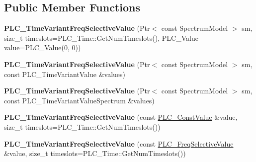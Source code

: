\subsection*{\-Public \-Member \-Functions}
\begin{DoxyCompactItemize}
\item 
\hypertarget{classns3_1_1PLC__TimeVariantFreqSelectiveValue_ae513ad6f9b4f73c838ec7fd92807067b}{{\bfseries \-P\-L\-C\-\_\-\-Time\-Variant\-Freq\-Selective\-Value} (\-Ptr$<$ const \-Spectrum\-Model $>$ sm, size\-\_\-t timeslots=\-P\-L\-C\-\_\-\-Time\-::\-Get\-Num\-Timeslots(), \-P\-L\-C\-\_\-\-Value value=\-P\-L\-C\-\_\-\-Value(0, 0))}\label{classns3_1_1PLC__TimeVariantFreqSelectiveValue_ae513ad6f9b4f73c838ec7fd92807067b}

\item 
\hypertarget{classns3_1_1PLC__TimeVariantFreqSelectiveValue_a6f5410bc5bcc702735d5d9fb571e8fd5}{{\bfseries \-P\-L\-C\-\_\-\-Time\-Variant\-Freq\-Selective\-Value} (\-Ptr$<$ const \-Spectrum\-Model $>$ sm, const \-P\-L\-C\-\_\-\-Time\-Variant\-Value \&values)}\label{classns3_1_1PLC__TimeVariantFreqSelectiveValue_a6f5410bc5bcc702735d5d9fb571e8fd5}

\item 
\hypertarget{classns3_1_1PLC__TimeVariantFreqSelectiveValue_a03b0495e0aba420d4c218d62064105d2}{{\bfseries \-P\-L\-C\-\_\-\-Time\-Variant\-Freq\-Selective\-Value} (\-Ptr$<$ const \-Spectrum\-Model $>$ sm, const \-P\-L\-C\-\_\-\-Time\-Variant\-Value\-Spectrum \&values)}\label{classns3_1_1PLC__TimeVariantFreqSelectiveValue_a03b0495e0aba420d4c218d62064105d2}

\item 
\hypertarget{classns3_1_1PLC__TimeVariantFreqSelectiveValue_a510556e902118152bcc93743e781a4bb}{{\bfseries \-P\-L\-C\-\_\-\-Time\-Variant\-Freq\-Selective\-Value} (const \hyperlink{classns3_1_1PLC__ConstValue}{\-P\-L\-C\-\_\-\-Const\-Value} \&value, size\-\_\-t timeslots=\-P\-L\-C\-\_\-\-Time\-::\-Get\-Num\-Timeslots())}\label{classns3_1_1PLC__TimeVariantFreqSelectiveValue_a510556e902118152bcc93743e781a4bb}

\item 
\hypertarget{classns3_1_1PLC__TimeVariantFreqSelectiveValue_a22998b3dd37b2f158ca0470a7c83b401}{{\bfseries \-P\-L\-C\-\_\-\-Time\-Variant\-Freq\-Selective\-Value} (const \hyperlink{classns3_1_1PLC__FreqSelectiveValue}{\-P\-L\-C\-\_\-\-Freq\-Selective\-Value} \&value, size\-\_\-t timeslots=\-P\-L\-C\-\_\-\-Time\-::\-Get\-Num\-Timeslots())}\label{classns3_1_1PLC__TimeVariantFreqSelectiveValue_a22998b3dd37b2f158ca0470a7c83b401}


\end{DoxyCompactItemize}
